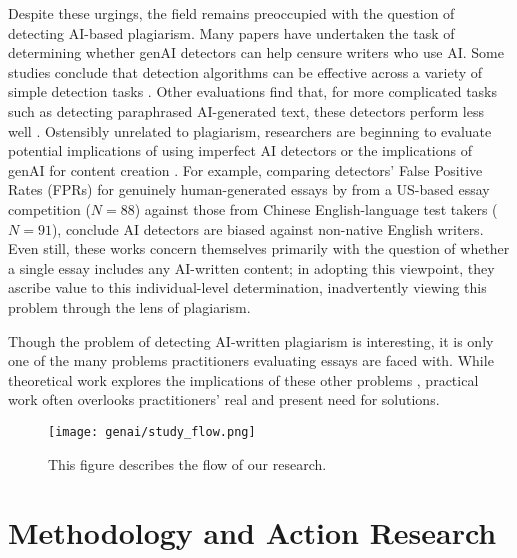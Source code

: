 Despite these urgings, the field remains preoccupied with the question of detecting AI-based plagiarism. Many papers have undertaken the task of determining whether genAI detectors can help censure writers who use AI. Some studies conclude that detection algorithms can be effective across a variety of simple detection tasks \cite{dugan_raid_2024,weber-wulff_testing_2023,tharindu_kumarage_stylometric_2023,elkhatat_evaluating_2023,mitchell_detectgpt_2023}. Other evaluations find that, for more complicated tasks such as detecting paraphrased AI-generated text, these detectors perform less well \cite{kalpesh_krishna_paraphrasing_2023}. Ostensibly unrelated to plagiarism, researchers are beginning to evaluate potential implications of using imperfect AI detectors \cite{liang_gpt_2023} or the implications of genAI for content creation \cite{kalpesh_krishna_paraphrasing_2023}. For example, comparing detectors' False Positive Rates (FPRs) for genuinely human-generated essays by from a US-based essay competition ($N = 88$) against those from Chinese English-language test takers ($N = 91$), \textcite{liang_gpt_2023} conclude AI detectors are biased against non-native English writers. Even still, these works concern themselves primarily with the question of whether a single essay includes any AI-written content; in adopting this viewpoint, they ascribe value to this individual-level determination, inadvertently viewing this problem through the lens of plagiarism.

Though the problem of detecting AI-written plagiarism is interesting, it is only one of the many problems practitioners evaluating essays are faced with. While theoretical work explores the implications of these other problems \cite{otterbacher_why_2023,yu_huang_reflection_2023}, practical work often overlooks practitioners' real and present need for solutions.

\begin{figure}[htbp]
  \centering
  \texttt{[image: genai/study\_flow.png]}
  \caption{This figure describes the flow of our research.}
  \label{fig:flow}
\end{figure}

\section{Methodology and Action Research}\label{sec:embedded}
